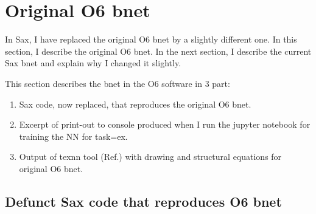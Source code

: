 \documentclass[12pt]{article}
\begin{document}
\section{Original O6 bnet}

In Sax, I have replaced the original
O6 bnet by a slightly different one.
In this section, I describe the
original O6 bnet. In the next section, I describe the current
Sax bnet and explain why I changed it slightly.

This section describes the bnet 
in the O6 software in 3 part:
\begin{enumerate}

\item Sax code, now replaced, that 
reproduces the original O6 bnet.
\item Excerpt of print-out to console produced when I run
the jupyter notebook for training 
the NN for task=ex.

\item Output of texnn tool (Ref.\cite{texnn})
with drawing 
and structural equations for original O6 bnet.


\end{enumerate}


\subsection{ 
Defunct Sax code that reproduces
O6 bnet}
\end{document}
